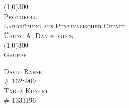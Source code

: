 \begin{titlepage}
  
  \begin{center}
    \line(1,0){300}\\
    [0.25in]
    \textsc{\Huge{Protokoll \\
    	Laborübung aus Physikalischer Chemie \\
    	Übung A: Dampfdruck}}\\
    [3mm]
    \line(1,0){300}\\
    [1in]
    \textsc{\Large{Gruppe}}\\


    \begin{flushright}
      \textsc{David Raese\\
      \# 1628909} \\
      \textsc{Tabea Kunert \\
      \# 1331196}
    \end{flushright}
  \end{center}
\end{titlepage}
